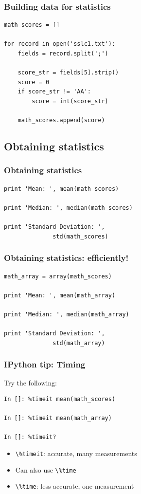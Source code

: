 \documentclass[14pt,compress]{beamer}
\newcounter{time}
\newcommand{\inctime}[1]{\addtocounter{time}{#1}{\tiny \thetime\ m}}
\newcommand{\typ}[1]{\lstinline{#1}}
\begin{document}
\begin{frame}[fragile]
  \frametitle{Building data for statistics}
  \begin{lstlisting}
math_scores = []

for record in open('sslc1.txt'):
    fields = record.split(';')

    score_str = fields[5].strip()
    score = 0
    if score_str != 'AA':
        score = int(score_str)

    math_scores.append(score)
  \end{lstlisting}
\end{frame}

\subsection{Obtaining statistics}
\begin{frame}[fragile]
  \frametitle{Obtaining statistics}
  \begin{lstlisting}
print 'Mean: ', mean(math_scores)

print 'Median: ', median(math_scores)

print 'Standard Deviation: ',
              std(math_scores)
  \end{lstlisting}
  \inctime{10}
\end{frame}

\begin{frame}[fragile]
  \frametitle{Obtaining statistics: efficiently!}
  \begin{lstlisting}
math_array = array(math_scores)

print 'Mean: ', mean(math_array)

print 'Median: ', median(math_array)

print 'Standard Deviation: ',
              std(math_array)
  \end{lstlisting}
  \inctime{5}
\end{frame}

\begin{frame}[fragile]
  \frametitle{IPython tip: Timing}

Try the following:
  \begin{lstlisting}
In []: %timeit mean(math_scores)

In []: %timeit mean(math_array)

In []: %timeit?

  \end{lstlisting}

  \begin{itemize}
      \item \typ{\%timeit}: accurate, many measurements
      \item Can also use \typ{\%time}
      \item \typ{\%time}: less accurate, one measurement 
  \end{itemize}

  \inctime{5}
\end{frame}
\end{document}
